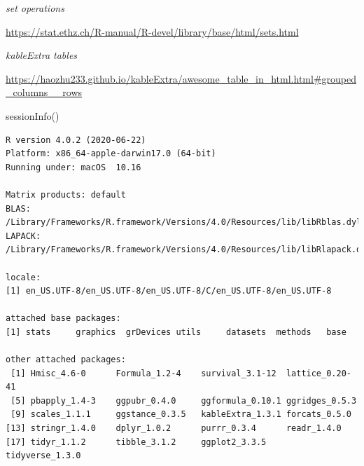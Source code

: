 \documentclass[
  letterpaper,
  DIV=11,
  numbers=noendperiod]{scrreprt}
\newenvironment{Shaded}{\begin{snugshade}}{\end{snugshade}}
\newcommand{\FunctionTok}[1]{\textcolor[rgb]{0.28,0.35,0.67}{#1}}
\newcommand{\NormalTok}[1]{\textcolor[rgb]{0.00,0.23,0.31}{#1}}
\begin{document}
\emph{set operations}

\url{https://stat.ethz.ch/R-manual/R-devel/library/base/html/sets.html}

\emph{kableExtra tables}

\url{https://haozhu233.github.io/kableExtra/awesome_table_in_html.html\#grouped_columns__rows}

\begin{Shaded}
\begin{Highlighting}[]
\FunctionTok{sessionInfo}\NormalTok{()}
\end{Highlighting}
\end{Shaded}

\begin{verbatim}
R version 4.0.2 (2020-06-22)
Platform: x86_64-apple-darwin17.0 (64-bit)
Running under: macOS  10.16

Matrix products: default
BLAS:   /Library/Frameworks/R.framework/Versions/4.0/Resources/lib/libRblas.dylib
LAPACK: /Library/Frameworks/R.framework/Versions/4.0/Resources/lib/libRlapack.dylib

locale:
[1] en_US.UTF-8/en_US.UTF-8/en_US.UTF-8/C/en_US.UTF-8/en_US.UTF-8

attached base packages:
[1] stats     graphics  grDevices utils     datasets  methods   base     

other attached packages:
 [1] Hmisc_4.6-0      Formula_1.2-4    survival_3.1-12  lattice_0.20-41 
 [5] pbapply_1.4-3    ggpubr_0.4.0     ggformula_0.10.1 ggridges_0.5.3  
 [9] scales_1.1.1     ggstance_0.3.5   kableExtra_1.3.1 forcats_0.5.0   
[13] stringr_1.4.0    dplyr_1.0.2      purrr_0.3.4      readr_1.4.0     
[17] tidyr_1.1.2      tibble_3.1.2     ggplot2_3.3.5    tidyverse_1.3.0 


\end{verbatim}
\end{document}
